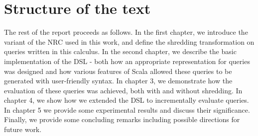 \section{Structure of the text} {
The rest of the report proceeds as follows. In the first chapter, we introduce the variant of the NRC used in this work, and define the shredding transformation on queries written in this calculus. In the second chapter, we describe the basic implementation of the DSL - both how an appropriate representation for queries was designed and how various features of Scala allowed these queries to be generated with user-friendly syntax. In chapter 3, we demonstrate how the evaluation of these queries was achieved, both with and without shredding.  In chapter 4, we show how we extended the DSL to incrementally evaluate queries. In chapter 5 we provide some experimental results and discuss their significance. Finally, we provide some concluding remarks including possible directions for future work.
}